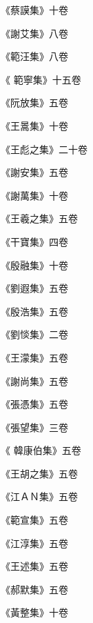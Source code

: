 \begin{pinyinscope}
 《蔡謨集》十卷



 《謝艾集》八卷



 《範汪集》八卷



 《
 範寧集》十五卷



 《阮放集》五卷



 《王暠集》十卷



 《王彪之集》二十卷



 《謝安集》五卷



 《謝萬集》十卷



 《王羲之集》五卷



 《干寶集》四卷



 《殷融集》十卷



 《劉遐集》五卷



 《殷浩集》五卷



 《劉惔集》二卷



 《王濛集》五卷



 《謝尚集》五卷



 《張憑集》五卷



 《張望集》三卷



 《
 韓康伯集》五卷



 《王胡之集》五卷



 《江ＡＮ集》五卷



 《範宣集》五卷



 《江淳集》五卷



 《王述集》五卷



 《郝默集》五卷



 《黃整集》十卷




\end{pinyinscope}
